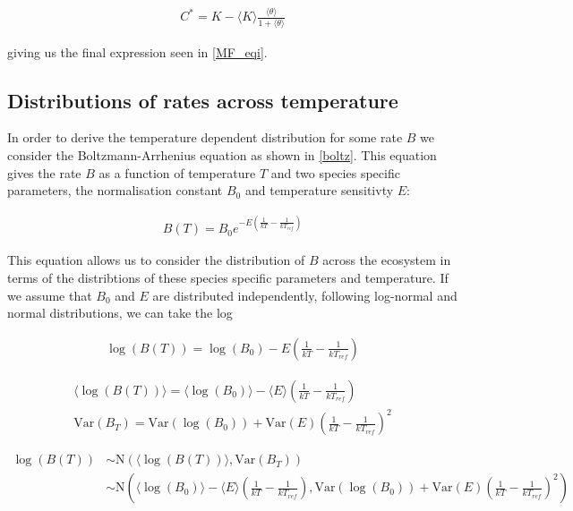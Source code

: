 \documentclass{article}
\begin{document}
\begin{align}
    C^* = K- \langle K \rangle \frac{\langle \theta \rangle}{1 + \langle \theta \rangle}
\end{align}

giving us the final expression seen in \cref{MF_eqi}.

\subsection{Distributions of rates across temperature}

In order to derive the temperature dependent distribution for some rate $B$ we consider the Boltzmann-Arrhenius equation as shown in \cref{boltz}. This equation gives the rate $B$ as a function of temperature $T$ and two species specific parameters, the normalisation constant $B_0$ and temperature sensitivty $E$:

\begin{align}
  B(T) = B_0 e^{-E \left(\frac{1}{kT} - \frac{1}{kT_{ref}} \right) }
\end{align}

This equation allows us to consider the distribution of $B$ across the ecosystem in terms of the distribtions of these species specific parameters and temperature. If we assume that $B_0$ and $E$ are distributed independently, following log-normal and normal distributions, we can take the log


\begin{align}
  \log(B(T)) = \log(B_0) -E \left(\frac{1}{kT} - \frac{1}{kT_{ref}} \right)
\end{align}


\begin{align}
  \langle \log(B(T)) \rangle  = \langle \log(B_0) \rangle - \langle E \rangle \left(\frac{1}{kT} - \frac{1}{kT_{ref}} \right)
  \\
  \text{Var}(B_T) = \text{Var}(\log(B_0)) + \text{Var}(E) \left(\frac{1}{kT} - \frac{1}{kT_{ref}} \right)^2
\end{align}

\begin{align}
  \log(B(T)) &\sim \text{N}(\langle \log(B(T)) \rangle  , \text{Var}(B_T))
  \\
  &\sim \text{N}(\langle \log(B_0) \rangle - \langle E \rangle \left(\frac{1}{kT} - \frac{1}{kT_{ref}} \right),
               \text{Var}(\log(B_0)) + \text{Var}(E) \left(\frac{1}{kT} - \frac{1}{kT_{ref}} \right)^2)
\end{align}
\end{document}
